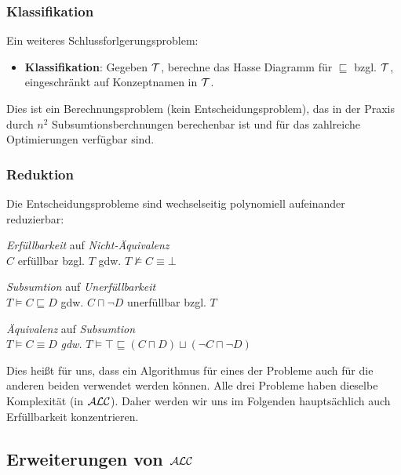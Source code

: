 \subsubsection{Klassifikation}

Ein weiteres Schlussforlgerungsproblem:

\begin{itemize}
  \item \textbf{Klassifikation}: Gegeben $\mathcal{T}$, berechne das Hasse Diagramm für $\sqsubseteq$ bzgl. $\mathcal{T}$, eingeschränkt auf Konzeptnamen in $\mathcal{T}$.
\end{itemize}

Dies ist ein Berechnungsproblem (kein Entscheidungsproblem), das in der Praxis durch $n^2$ Subsumtionsberchnungen berechenbar ist und für das zahlreiche Optimierungen verfügbar sind.

\subsubsection{Reduktion}

Die Entscheidungsprobleme sind wechselseitig polynomiell aufeinander reduzierbar:

\begin{lemma}
\begin{enumerate}
\item{\emph{Erfüllbarkeit} auf \emph{Nicht-Äquivalenz} \\
$C$ erfüllbar bzgl. $T$ gdw. $T \not\vDash C \equiv \bot$}
\item{\emph{Subsumtion} auf \emph{Unerfüllbarkeit} \\
$T \vDash C \sqsubseteq D$ gdw. $C \sqcap \neg D$ unerfüllbar bzgl.
$T$
\item{\emph{Äquivalenz} auf \emph{Subsumtion} \\}
$T \vDash C \equiv D$ \emph{gdw.} $T \vDash \top \sqsubseteq \left( C \sqcap D \right) \sqcup \left( \neg C \sqcap \neg D \right)$}
\end{enumerate}
\end{lemma}

Dies heißt für uns, dass ein Algorithmus für eines der Probleme auch für die anderen beiden verwendet werden können. Alle drei Probleme haben dieselbe Komplexität (in $\mathcal{A}\mathcal{L}\mathcal{C}$). Daher werden wir uns im Folgenden hauptsächlich auch Erfüllbarkeit konzentrieren.

\subsection{Erweiterungen von $\mathcal{A}\mathcal{L}\mathcal{C}$}\label{erweiterungen-von-alc}

